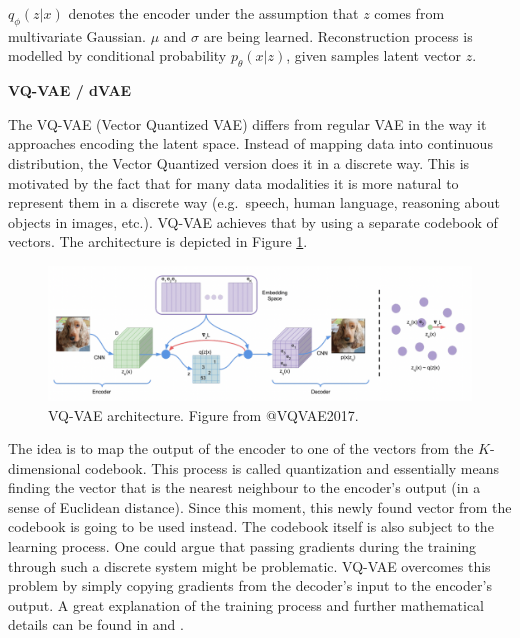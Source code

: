 \documentclass[
]{krantz}
\begin{document}
\(q_{\phi}(z|x)\) denotes the encoder under the assumption that \(z\) comes from multivariate Gaussian. \(\mu\) and \(\sigma\) are being learned. Reconstruction process is modelled by conditional probability \(p_{\theta}(x|z)\), given samples latent vector \(z\).

\textbf{VQ-VAE / dVAE}

The VQ-VAE (Vector Quantized VAE) \citep{VQVAE2017} differs from regular VAE in the way it approaches encoding the latent space. Instead of mapping data into continuous distribution, the Vector Quantized version does it in a discrete way. This is motivated by the fact that for many data modalities it is more natural to represent them in a discrete way (e.g.~speech, human language, reasoning about objects in images, etc.). VQ-VAE achieves that by using a separate codebook of vectors. The architecture is depicted in Figure \ref{fig:vqvae}.

\begin{figure}

{\centering \includegraphics[width=1\linewidth]{figures/02-02-text-2-img/vqvae} 

}

\caption{VQ-VAE architecture. Figure from @VQVAE2017.}\label{fig:vqvae}
\end{figure}

The idea is to map the output of the encoder to one of the vectors from the \(K\)-dimensional codebook. This process is called quantization and essentially means finding the vector that is the nearest neighbour to the encoder's output (in a sense of Euclidean distance). Since this moment, this newly found vector from the codebook is going to be used instead. The codebook itself is also subject to the learning process. One could argue that passing gradients during the training through such a discrete system might be problematic. VQ-VAE overcomes this problem by simply copying gradients from the decoder's input to the encoder's output. A great explanation of the training process and further mathematical details can be found in \citet{weng2018VAE} and \citet{UnderstandingVQVAE}.
\end{document}
